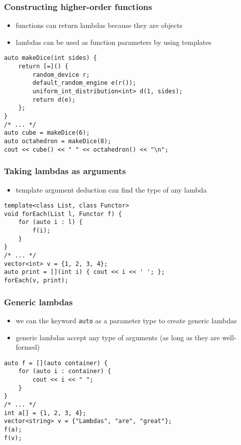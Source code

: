 \begin{frame}[fragile]
    \frametitle{Constructing higher-order functions}
    \begin{itemize}
        \item functions can return lambdas because they are objects
        \item lambdas can be used as function parameters by using templates
    \end{itemize}
    \begin{lstlisting}[numbers=none]
auto makeDice(int sides) {
    return [=]() {
        random_device r;
        default_random_engine e(r());
        uniform_int_distribution<int> d(1, sides);
        return d(e);
    };
}
/* ... */
auto cube = makeDice(6);
auto octahedron = makeDice(8);
cout << cube() << " " << octahedron() << "\n";
    \end{lstlisting}
\end{frame}

\begin{frame}[fragile]
    \frametitle{Taking lambdas as arguments}
    \begin{itemize}
        \item template argument deduction can find the type of any lambda
    \end{itemize}
    \begin{lstlisting}[numbers=none]
template<class List, class Functor>
void forEach(List l, Functor f) {
    for (auto i : l) {
        f(i);
    }
}
/* ... */
vector<int> v = {1, 2, 3, 4};
auto print = [](int i) { cout << i << ' '; };
forEach(v, print);
    \end{lstlisting}
\end{frame}
\begin{frame}[fragile]
    \frametitle{Generic lambdas}
    \begin{itemize}
        \item we can the keyword \lstinline{auto} as a parameter type to create generic lambdas
        \item generic lambdas accept any type of arguments (as long as they are well-formed)
    \end{itemize}
    \begin{lstlisting}[numbers=none]
auto f = [](auto container) {
    for (auto i : container) {
        cout << i << " ";
    }
}
/* ... */
int a[] = {1, 2, 3, 4};
vector<string> v = {"Lambdas", "are", "great"};
f(a);
f(v);
    \end{lstlisting}

\end{frame}

